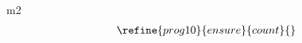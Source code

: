 \documentclass{article}
\begin{document}
\begin{machine}{m2}
\begin{align*}
	\refine{prog10}{ensure}{count}{} %
\end{align*}



\begin{align}
\end{align}






\begin{align}
\end{align}




\begin{align*}
\end{align*}



\end{machine}
\end{document}
